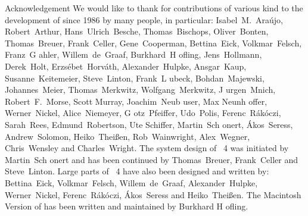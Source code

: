 {\obeylines
{\secfont Acknowledgement}
\bigskip
We would like to thank for contributions of various kind to the development
of {\GAP} since 1986 by many people, in particular:
\medskip
Isabel~M.~Ara{\'u}jo, Robert~Arthur, Hans~Ulrich~Besche, Thomas~Bischops,
Oliver~Bonten, Thomas~Breuer, Frank~Celler, Gene~Cooperman, Bettina~Eick,
Volkmar~Felsch, Franz~G{ a}hler, Willem~de~Graaf, Burkhard~H{ o}fling,
Jens~Hollmann, Derek~Holt, Erzs{\'e}bet~Horv{\'a}th, Alexander~Hulpke, Ansgar~Kaup,
Susanne~Keitemeier, Steve~Linton, Frank~L{ u}beck, Bohdan~Majewski,
Johannes~Meier, Thomas~Merkwitz, Wolfgang~Merkwitz, J{ u}rgen~Mnich,
Robert~F.~Morse, Scott Murray, Joachim~Neub{ u}ser, 
Max Neunh{ o}ffer, Werner~Nickel, Alice~Niemeyer, G{ o}tz~Pfeiffer, Udo~Polis,
Ferenc~R{\'a}k{\'o}czi, Sarah~Rees, Edmund~Robertson, Ute Schiffer,
Martin~Sch{ o}nert, {\'A}kos~Seress, Andrew~Solomon, Heiko~Thei{\ss}en,
Rob~Wainwright, Alex~Wegner, Chris~Wensley  and Charles~Wright.
\bigskip \bigskip \bigskip
The system design of {\GAP}~4 was initiated by
Martin~Sch{ o}nert and has been continued by
Thomas~Breuer, Frank~Celler and Steve~Linton.
\bigskip
Large parts of {\GAP}~4 have also been designed and written by:
\medskip
Bettina~Eick, Volkmar~Felsch, Willem~de~Graaf, Alexander~Hulpke,
Werner~Nickel, Ferenc~R{\'a}k{\'o}czi, {\'A}kos~Seress and Heiko~Thei{\ss}en.
\bigskip
The Macintosh Version of {\GAP} has been written and maintained by Burkhard
H{ o}fling.
}
